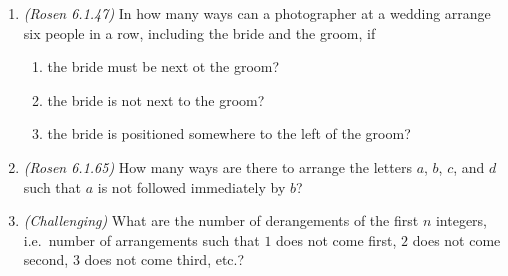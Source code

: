 \documentclass{article}
\begin{document}
\begin{enumerate}
\item {\em (Rosen 6.1.47)} In how many ways can a photographer at a wedding arrange six people in a row, including the bride and the groom, if
\begin{enumerate}
\item the bride must be next ot the groom?
\item the bride is not next to the groom?
\item the bride is positioned somewhere to the left of the groom?
\end{enumerate}

\item {\em (Rosen 6.1.65)} How many ways are there to arrange the letters $a$, $b$, $c$, and $d$ such that $a$ is not followed immediately by $b$?

\item {\em (Challenging)} What are the number of derangements of the first $n$ integers, i.e.\ number of arrangements such that $1$ does not come first, $2$ does not come second, $3$ does not come third, etc.?
\end{enumerate}
\end{document}
